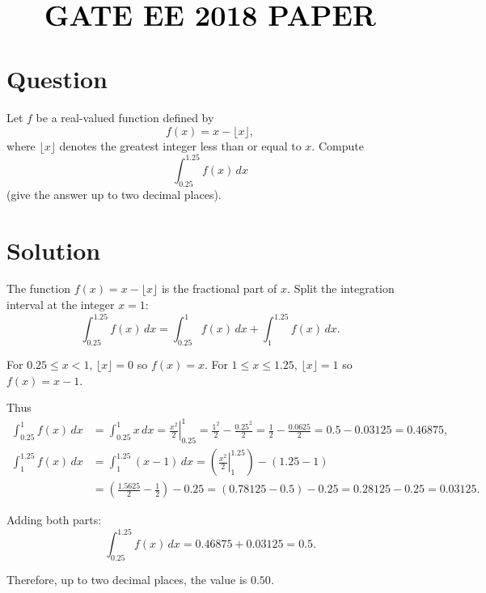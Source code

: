 \documentclass{article}
\date{\today}
\begin{document}
\thispagestyle{fancy}
\fancyhf{}
\renewcommand{\headrulewidth}{0.4pt}
\fancyfoot[c]{\thepage}
\vspace{1cm}
\begin{center}
$$\textbf{\Huge GATE EE 2018  PAPER}$$
\end{center}
\section*{Question}

Let \(f\) be a real-valued function defined by
\[
f(x)=x-\lfloor x\rfloor,
\]
where \(\lfloor x\rfloor\) denotes the greatest integer less than or equal to \(x\). Compute
\[
\int_{0.25}^{1.25} f(x)\,dx
\]
(give the answer up to two decimal places).

\section*{Solution}

The function \(f(x)=x-\lfloor x\rfloor\) is the fractional part of \(x\). Split the integration interval at the integer \(x=1\):
\[
\int_{0.25}^{1.25} f(x)\,dx
=\int_{0.25}^{1} f(x)\,dx + \int_{1}^{1.25} f(x)\,dx.
\]

For \(0.25\le x<1\), \(\lfloor x\rfloor=0\) so \(f(x)=x\).  
For \(1\le x\le 1.25\), \(\lfloor x\rfloor=1\) so \(f(x)=x-1\).

Thus
\begin{align*}
\int_{0.25}^{1} f(x)\,dx &= \int_{0.25}^{1} x\,dx
= \left.\frac{x^2}{2}\right|_{0.25}^{1}
= \frac{1^2}{2}-\frac{0.25^2}{2}
= \frac{1}{2}-\frac{0.0625}{2}
= 0.5-0.03125 = 0.46875, \\[6pt]
\int_{1}^{1.25} f(x)\,dx &= \int_{1}^{1.25} (x-1)\,dx
= \left(\left.\frac{x^2}{2}\right|_{1}^{1.25}\right) - (1.25-1) \\
&= \left(\frac{1.5625}{2}-\frac{1}{2}\right)-0.25
= (0.78125-0.5)-0.25
= 0.28125-0.25 = 0.03125.
\end{align*}

Adding both parts:
\[
\int_{0.25}^{1.25} f(x)\,dx = 0.46875 + 0.03125 = 0.5.
\]

Therefore, up to two decimal places, the value is \(\boxed{0.50}\).
\end{document}
